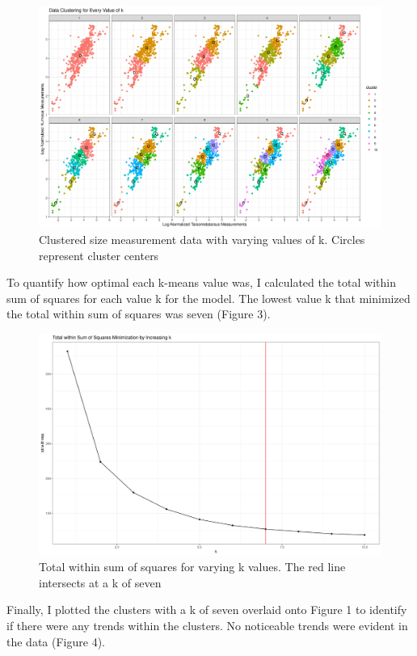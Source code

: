 \documentclass{bioinfo}
\begin{document}
\begin{figure}
\includegraphics[width=1\linewidth]{../outputs/centered_clusters} \caption{Clustered size measurement data with varying values of k. Circles represent cluster centers}\label{fig:figure2}
\end{figure}

To quantify how optimal each k-means value was, I calculated the total
within sum of squares for each value k for the model. The lowest value k
that minimized the total within sum of squares was seven (Figure 3).

\begin{figure}
\includegraphics[width=1\linewidth]{../outputs/tot.withinss_minimization} \caption{Total within sum of squares for varying k values. The red line intersects at a k of seven}\label{fig:figure3}
\end{figure}

Finally, I plotted the clusters with a k of seven overlaid onto Figure 1
to identify if there were any trends within the clusters. No noticeable
trends were evident in the data (Figure 4).
\end{document}
